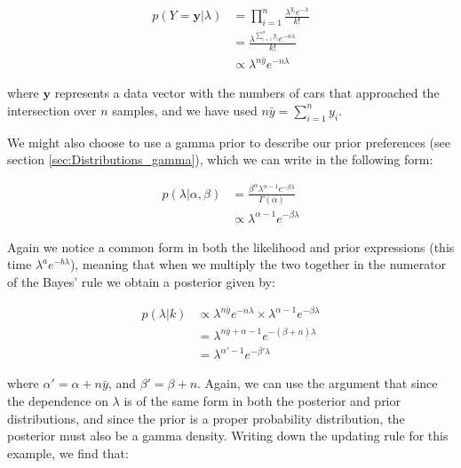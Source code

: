 \documentclass[11pt,fullpage]{book}
\begin{document}
\begin{equation}
\begin{align}
p(Y=\boldsymbol{y}|\lambda) &= \prod\limits_{i=1}^{n} \frac{\lambda^{y_i} e^{-\lambda}}{k!}\\
&= \frac{\lambda^{\sum\limits_{i=1}^{n}y_i} e^{-n\lambda}}{k!}\\
&\propto \lambda^{n \bar{y}} e^{-n\lambda}
\end{align}
\end{equation}

where $\boldsymbol{y}$ represents a data vector with the numbers of cars that approached the intersection over $n$ samples, and we have used $n \bar{y} = \sum\limits_{i=1}^{n}y_i$.

We might also choose to use a gamma prior to describe our prior preferences (see section \ref{sec:Distributions_gamma}), which we can write in the following form:

\begin{equation}\label{eq:Conjugate_gammaPrior}
\begin{align}
p(\lambda|\alpha,\beta) &= \frac{\beta^\alpha \lambda^{\alpha-1} e^{-\beta \lambda}}{\Gamma(\alpha)}\\
&\propto \lambda^{\alpha-1} e^{-\beta \lambda}
\end{align}
\end{equation}

Again we notice a common form in both the likelihood and prior expressions (this time $\lambda^a e^{-b \lambda}$), meaning that when we multiply the two together in the numerator of the Bayes' rule we obtain a posterior given by:

\begin{equation}
\begin{align}
p(\lambda|k) &\propto \lambda^{n \bar{y}} e^{-n\lambda} \times \lambda^{\alpha-1} e^{-\beta \lambda}\\
&= \lambda^{n \bar{y} + \alpha-1} e^{-(\beta+n) \lambda}\\
&= \lambda^{\alpha'-1} e^{-\beta' \lambda}
\end{align}
\end{equation}

where $\alpha' = \alpha + n \bar{y}$, and $\beta' = \beta + n$. Again, we can use the argument that since the dependence on $\lambda$ is of the same form in both the posterior and prior distributions, and since the prior is a proper probability distribution, the posterior must also be a gamma density. Writing down the updating rule for this example, we find that:
\end{document}
